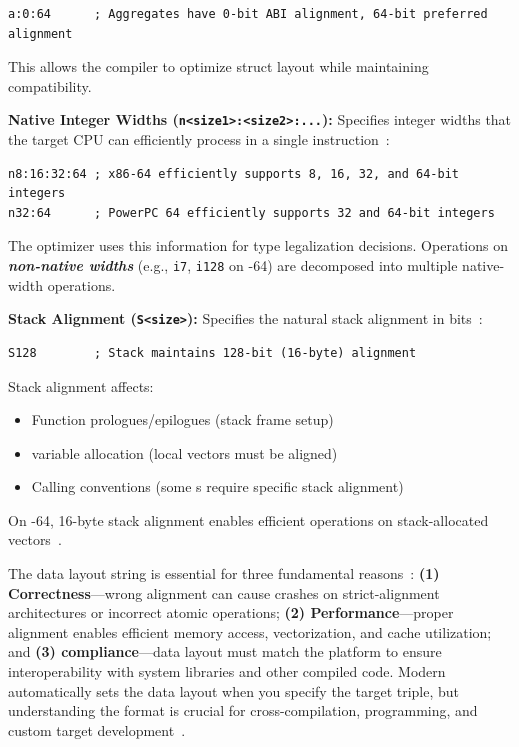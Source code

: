 \begin{lstlisting}[style=ir]
a:0:64      ; Aggregates have 0-bit ABI alignment, 64-bit preferred alignment
\end{lstlisting}

This allows the compiler to optimize struct layout while maintaining  compatibility.

\textbf{Native Integer Widths (\texttt{n<size1>:<size2>:...}):} Specifies integer widths that the target CPU can efficiently process in a single instruction~\cite{llvmlangref}:

\begin{lstlisting}[style=ir]
n8:16:32:64 ; x86-64 efficiently supports 8, 16, 32, and 64-bit integers
n32:64      ; PowerPC 64 efficiently supports 32 and 64-bit integers
\end{lstlisting}

The optimizer uses this information for type legalization decisions. Operations on \textbf{\textit{non-native widths}} (e.g., \texttt{i7}, \texttt{i128} on -64) are decomposed into multiple native-width operations.

\textbf{Stack Alignment (\texttt{S<size>}):} Specifies the natural stack alignment in bits~\cite{llvmlangref}:

\begin{lstlisting}[style=ir]
S128        ; Stack maintains 128-bit (16-byte) alignment
\end{lstlisting}

Stack alignment affects:
\begin{itemize}[noitemsep]
  \item Function prologues/epilogues (stack frame setup)
  \item {} variable allocation (local vectors must be aligned)
  \item Calling conventions (some s require specific stack alignment)
\end{itemize}

On -64, 16-byte stack alignment enables efficient  operations on stack-allocated vectors~\cite{lopesauler2014}.

The data layout string is essential for three fundamental reasons~\cite{llvmessentials}: \textbf{(1) Correctness}---wrong alignment can cause crashes on strict-alignment architectures or incorrect atomic operations; \textbf{(2) Performance}---proper alignment enables efficient memory access,  vectorization, and cache utilization; and \textbf{(3)  compliance}---data layout must match the platform  to ensure interoperability with system libraries and other compiled code. Modern  automatically sets the data layout when you specify the target triple, but understanding the format is crucial for cross-compilation,  programming, and custom target development~\cite{lopesauler2014}.
